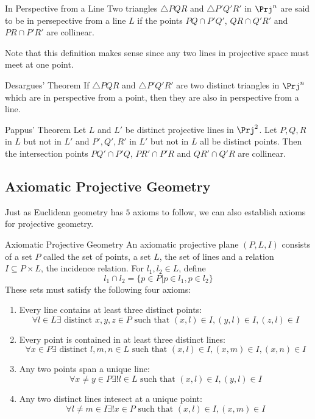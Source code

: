 \begin{defn}{In Perspective from a Line}{} Two triangles $\triangle PQR$ and $\triangle P'Q'R'$ in $\Prj^n$ are said to be in persepective from a line $L$ if the points $PQ\cap P'Q'$, $QR\cap Q'R'$ and $PR\cap P'R'$ are collinear. 
\end{defn}

Note that this definition makes sense since any two lines in projective space must meet at one point. 

\begin{thm}{Desargues' Theorem}{} If $\triangle PQR$ and $\triangle P'Q'R'$ are two distinct triangles in $\Prj^n$ which are in perspective from a point, then they are also in perspective from a line. 
\end{thm}

\begin{thm}{Pappus' Theorem}{} Let $L$ and $L'$ be distinct projective lines in $\Prj^2$. Let $P,Q,R$ in $L$ but not in $L'$ and $P',Q',R'$ in $L'$ but not in $L$ all be distinct points. Then the intersection points $PQ'\cap P'Q$, $PR'\cap P'R$ and $QR'\cap Q'R$ are collinear. 
\end{thm}

\subsection{Axiomatic Projective Geometry}
Just as Euclidean geometry has $5$ axioms to follow, we can also establish axioms for projective geometry. 

\begin{defn}{Axiomatic Projective Geometry}{} An axiomatic projective plane $(P,L,I)$ consists of a set $P$ called the set of points, a set $L$, the set of lines and a relation $I\subseteq P\times L$, the incidence relation. For $l_1,l_2\in L$, define $$l_1\cap l_2=\{p\in P|p\in l_1, p\in l_2\}$$ These sets must satisfy the following four axioms:
\begin{enumerate}
\item Every line contains at least three distinct points: $$\forall l\in L\exists\text{ distinct }x,y,z\in P\text{ such that }(x,l)\in I, (y,l)\in I, (z,l)\in I$$
\item Every point is contained in at least three distinct lines: $$\forall x\in P\exists\text{ distinct }l,m,n\in L\text{ such that }(x,l)\in I, (x,m)\in I, (x,n)\in I$$
\item Any two points span a unique line: $$\forall x\neq y\in P\exists!l\in L\text{ such that }(x,l)\in I, (y,l)\in I$$
\item Any two distinct lines intesect at a unique point: $$\forall l\neq m\in I\exists!x\in P\text{ such that }(x,l)\in I, (x,m)\in I$$
\end{enumerate}
\end{defn}